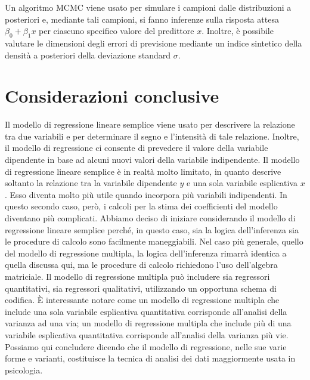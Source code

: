 \documentclass[
  10pt,
  italian,
  a4paper,
  extrafontsizes,onecolumn,openright
  ]{memoir}
\begin{document}
Un algoritmo MCMC viene usato per simulare i campioni dalle distribuzioni a posteriori e, mediante tali campioni, si fanno inferenze sulla risposta attesa \(\beta_0 + \beta_1 x\) per ciascuno specifico valore del predittore \(x\). Inoltre, è possibile valutare le dimensioni degli errori di previsione mediante un indice sintetico della densità a posteriori della deviazione standard \(\sigma\).

\hypertarget{considerazioni-conclusive}{%
\section*{Considerazioni conclusive}\label{considerazioni-conclusive}}

Il modello di regressione lineare semplice viene usato per descrivere la
relazione tra due variabili e per determinare il segno e l'intensità di
tale relazione. Inoltre, il modello di regressione ci consente di
prevedere il valore della variabile dipendente in base ad alcuni nuovi
valori della variabile indipendente. Il modello di regressione lineare
semplice è in realtà molto limitato, in quanto descrive soltanto la
relazione tra la variabile dipendente \(y\) e una sola variabile
esplicativa \(x\). Esso diventa molto più utile quando incorpora più
variabili indipendenti. In questo secondo caso, però, i calcoli per la
stima dei coefficienti del modello diventano più complicati. Abbiamo
deciso di iniziare considerando il modello di regressione lineare semplice
perché, in questo caso, sia la logica dell'inferenza sia le procedure di
calcolo sono facilmente maneggiabili. Nel caso più generale, quello del
modello di regressione multipla, la logica dell'inferenza rimarrà
identica a quella discussa qui, ma le procedure di calcolo richiedono
l'uso dell'algebra matriciale. Il modello di regressione multipla può includere sia regressori quantitativi, sia regressori qualitativi, utilizzando un
opportuna schema di codifica. È interessante notare come un modello di
regressione multipla che include una sola variabile esplicativa
quantitativa corrisponde all'analisi della varianza ad una via; un
modello di regressione multipla che include più di una variabile
esplicativa quantitativa corrisponde all'analisi della varianza più vie.
Possiamo qui concludere dicendo che il modello di regressione, nelle sue varie forme e varianti, costituisce la tecnica di analisi dei dati maggiormente usata in psicologia.


\end{document}
